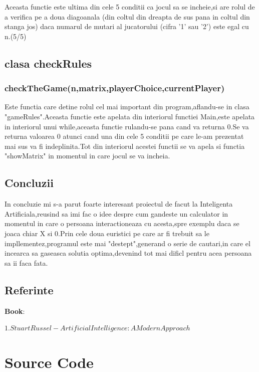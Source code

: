 \documentclass[12]{article}
\begin{document}
Aceasta functie este ultima din cele 5 conditii ca jocul sa se incheie,si are rolul de a verifica pe a doua diagoanala (din coltul din dreapta de sus pana in coltul din stanga jos) daca numarul de mutari al jucatorului (cifra '1' sau '2') este egal cu n.(5/5)

\subsection{clasa checkRules}
\subsubsection{checkTheGame(n,matrix,playerChoice,currentPlayer)}
\textcolor{white}{}

Este functia care detine rolul cel mai important din program,aflandu-se in clasa "gameRules".Aceasta functie este apelata din interiorul functiei Main,este apelata in interiorul unui while,aceasta functie rulandu-se pana cand va returna 0.Se va returna valoarea 0 atunci cand una din cele 5 conditii pe care le-am prezentat mai sus va fi indeplinita.Tot din interiorul acestei functii se va apela si functia "showMatrix" in momentul in care jocul se va incheia.

\subsection{Concluzii}
\textcolor{white}{}

In concluzie mi s-a parut foarte interesant proiectul de facut la Inteligenta Artificiala,reusind sa imi fac o idee despre cum gandeste un calculator in momentul in care o persoana interactioneaza cu acesta,spre exemplu daca se joaca chiar X si 0.Prin cele doua euristici pe care ar fi trebuit sa le impllementez,programul este mai "destept",generand o serie de cautari,in care el incearca sa gaseasca solutia optima,devenind tot mai dificl pentru acea persoana sa ii faca fata.

\subsection{Referinte}
\textcolor{white}{}

\textbf{Book}:

$1.Stuart Russel - Artificial Intelligence: A Modern Approach$


\newpage
\section{Source Code}
\end{document}
